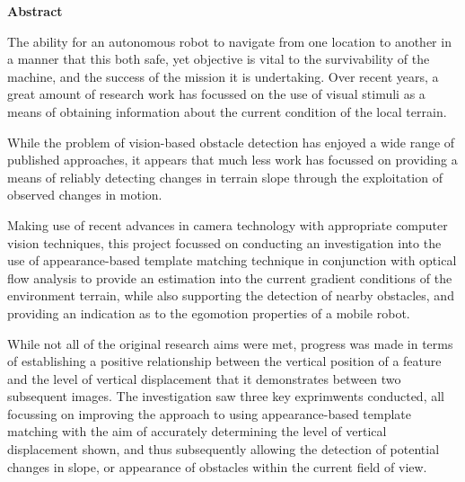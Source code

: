 \thispagestyle{empty}

\begin{center}
    {\LARGE\bf Abstract}
\end{center}


The ability for an autonomous robot to navigate from one location to another in a manner that this both safe, yet objective is vital to the survivability of the machine, and the success of the mission it is undertaking. Over recent years, a great amount of research work has focussed on the use of visual stimuli as a means of obtaining information about the current condition of the local terrain. 

While the problem of vision-based obstacle detection has enjoyed a wide range of published approaches, it appears that much less work has focussed on providing a means of reliably detecting changes in terrain slope through the exploitation of observed changes in motion.

Making use of recent advances in camera technology with appropriate computer vision techniques, this project focussed on conducting an investigation into the use of appearance-based template matching technique in conjunction with optical flow analysis to provide an estimation into the current gradient conditions of the environment terrain, while also supporting the detection of nearby obstacles, and providing an indication as to the egomotion properties of a mobile robot.

While not all of the original research aims were met, progress was made in terms of establishing a positive relationship between the vertical position of a feature and the level of vertical displacement that it demonstrates between two subsequent images. The investigation saw three key exprimwents conducted, all focussing on improving the approach to using appearance-based template matching with the aim of accurately determining the level of vertical displacement shown, and thus subsequently allowing the detection of potential changes in slope, or appearance of obstacles within the current field of view.


